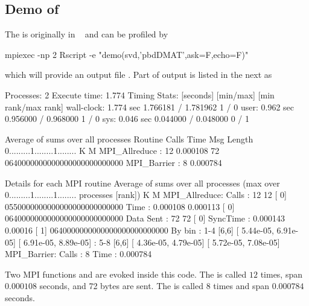 \subsection{Demo of }

The  is originally in
~\citep{Schmidt2012pbdBASEpackage}
and can be profiled by
\begin{Code}
mpiexec -np 2 Rscript -e "demo(svd,'pbdDMAT',ask=F,echo=F)"
\end{Code}
which will provide an output file .
Part of output is listed in the next as
\begin{Output}
Processes:	2
Execute time:	1.774
Timing Stats: [seconds]	[min/max]    	[min rank/max rank]
  wall-clock: 1.774 sec	1.766181 / 1.781962	1 / 0
        user: 0.962 sec	0.956000 / 0.968000	1 / 0
         sys: 0.046 sec	0.044000 / 0.048000	0 / 1

                  Average of sums over all processes
Routine                 Calls       Time Msg Length    %
                                                    0.........1........1........
                                                              K        M
MPI_Allreduce       :      12   0.000108         72 0640000000000000000000000000
MPI_Barrier         :       8   0.000784

Details for each MPI routine
                  Average of sums over all processes
                                (max over          0.........1........1........
                                 processes [rank])           K        M
MPI_Allreduce:
	Calls     :         12           12 [   0] 0550000000000000000000000000
	Time      :   0.000108     0.000113 [   0] 0640000000000000000000000000
	Data Sent :         72           72 [   0]
	SyncTime  :   0.000143      0.00016 [   1] 0640000000000000000000000000
	By bin    : 1-4	[6,6]	[  5.44e-05,  6.91e-05]	[  6.91e-05,  8.89e-05]
	          : 5-8	[6,6]	[  4.36e-05,  4.79e-05]	[  5.72e-05,  7.08e-05]
MPI_Barrier:
	Calls     :          8
	Time      :   0.000784

\end{Output}
Two MPI  functions  and  are
evoked inside this  code. The  is called $12$
times, span $0.000108$ seconds, and 72 bytes are sent.
The  is called $8$ times and span $0.000784$ seconds.



